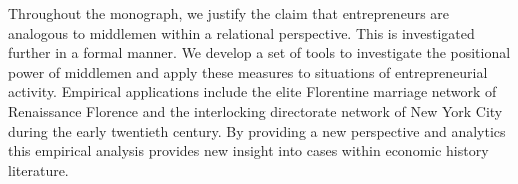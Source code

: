 \documentclass[11pt,fleqn]{book}
\begin{document}
\begin{singlespace}
Throughout the monograph, we justify the claim that entrepreneurs are analogous to middlemen within a relational perspective. This is investigated further in a formal manner. We develop a set of tools to investigate the positional power of middlemen and apply these measures to situations of entrepreneurial activity. Empirical applications include the elite Florentine marriage network of Renaissance Florence and the interlocking directorate network of New York City during the early twentieth century. By providing a new perspective and analytics this empirical analysis provides new insight into cases within economic history literature.

\end{singlespace}

\newpage
\mbox{}
\thispagestyle{empty}
\newpage













\singlespace




\end{document}
